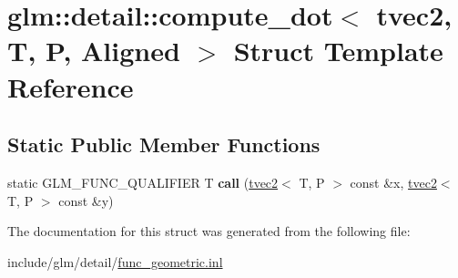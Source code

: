 \hypertarget{structglm_1_1detail_1_1compute__dot_3_01tvec2_00_01T_00_01P_00_01Aligned_01_4}{}\section{glm\+:\+:detail\+:\+:compute\+\_\+dot$<$ tvec2, T, P, Aligned $>$ Struct Template Reference}
\label{structglm_1_1detail_1_1compute__dot_3_01tvec2_00_01T_00_01P_00_01Aligned_01_4}
\subsection*{Static Public Member Functions}
\begin{DoxyCompactItemize}
\item 
\mbox{\label{structglm_1_1detail_1_1compute__dot_3_01tvec2_00_01T_00_01P_00_01Aligned_01_4_aab7e677d1e8f1a9935637fb6e8a4342d}} 
static G\+L\+M\+\_\+\+F\+U\+N\+C\+\_\+\+Q\+U\+A\+L\+I\+F\+I\+ER T {\bfseries call} (\hyperlink{structglm_1_1tvec2}{tvec2}$<$ T, P $>$ const \&x, \hyperlink{structglm_1_1tvec2}{tvec2}$<$ T, P $>$ const \&y)
\end{DoxyCompactItemize}


The documentation for this struct was generated from the following file\+:\begin{DoxyCompactItemize}
\item 
include/glm/detail/\hyperlink{func__geometric_8inl}{func\+\_\+geometric.\+inl}\end{DoxyCompactItemize}
